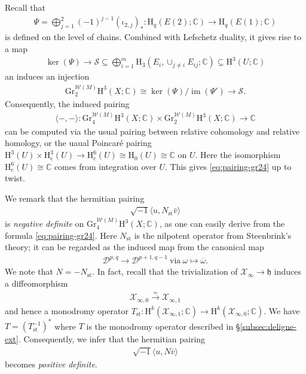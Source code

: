 Recall that 
\begin{eqnarray*}
\Psi = \bigoplus_{j=1}^{2} (-1)^{j-1}(\iota_{2,j})_{\ast}\colon 
\mathrm{H}_{q}(E(2);\mathbb{C})\to \mathrm{H}_{q}(E(1);\mathbb{C})
\end{eqnarray*}
is defined on the level of chains.
Combined with Lefschetz duality, it gives rise to a map
\begin{eqnarray*}
\operatorname{ker}(\Psi)\to \mathcal{S}\subseteq
\bigoplus_{i=1}^{m}\mathrm{H}_{3}(E_{i},\cup_{j\ne i}E_{ij};\mathbb{C})\subseteq
\mathrm{H}^{3}(U;\mathbb{C})
\end{eqnarray*}
an induces an injection
\begin{eqnarray*}
\mathrm{Gr}_{2}^{\mathcal{W}(M)}\mathrm{H}^{3}(X;\mathbb{C})\cong\operatorname{ker}(\Psi)
\slash\operatorname{im}(\Psi')\to \mathcal{S}.
\end{eqnarray*}
Consequently, the induced pairing 
\begin{eqnarray*}
\langle -,-\rangle\colon \mathrm{Gr}_{4}^{\mathcal{W}(M)}\mathrm{H}^{3}(X;\mathbb{C})
\times \mathrm{Gr}_{2}^{\mathcal{W}(M)}\mathrm{H}^{3}(X;\mathbb{C}) \to \mathbb{C}
\end{eqnarray*}
can be computed via the usual pairing between
relative cohomology and relative homology, or
the uaual Poincar\'{e} pairing
\(\mathrm{H}^{3}(U)\times\mathrm{H}^{3}_{\mathrm{c}}(U)\to \mathrm{H}^{6}_{\mathrm{c}}(U)
\cong\mathrm{H}_{0}(U)
\cong\mathbb{C}\) 
on \(U\). Here the isomorphism \(\mathrm{H}^{6}_{\mathrm{c}}(U)
\cong\mathbb{C}\) comes from integration over \(U\). 
This gives \eqref{eq:pairing-gr24}
up to twist.
\begin{remark}
We remark that the hermitian pairing
\begin{eqnarray*}
\sqrt{-1}\langle u,N_{\mathrm{st}}\bar{v}\rangle
\end{eqnarray*}
is \emph{negative definite} on 
\(\mathrm{Gr}_{4}^{\mathcal{W}(M)}\mathrm{H}^{3}(X;\mathbb{C})\), as
one can easily derive from the formula \eqref{eq:pairing-gr24}.
Here \(N_{\mathrm{st}}\) is the nilpotent operator 
from Steenbrink's theory; it can be
regarded as the induced map from the canonical map 
\begin{eqnarray*}
\mathcal{D}^{p,q}\to \mathcal{D}^{p+1,q-1}~\mbox{via}~
\omega\mapsto \overline{\omega}.
\end{eqnarray*}
We note that \(N=-N_{\mathrm{st}}\). In fact, recall that 
the trivialization of \(\mathcal{X}_{\infty}\to\mathfrak{h}\)
induces a diffeomorphism
\begin{eqnarray*}
\mathcal{X}_{\infty,0}\xrightarrow{\simeq}\mathcal{X}_{\infty,1}
\end{eqnarray*}
and hence a monodromy operator \(T_{\mathrm{st}}
\colon \mathrm{H}^{k}(\mathcal{X}_{\infty,1};\mathbb{C})
\to \mathrm{H}^{k}(\mathcal{X}_{\infty,0};\mathbb{C})\).
We have \(T=(T_{\mathrm{st}}^{-1})^{\ast}\)
where \(T\) is the monodromy operator described in \S\ref{subsec:deligne-ext}.
Consequently, we infer that the hermitian pairing
\begin{eqnarray*}
\sqrt{-1}\langle u,N\bar{v}\rangle
\end{eqnarray*}
becomes \emph{positive definite}.
\end{remark}

